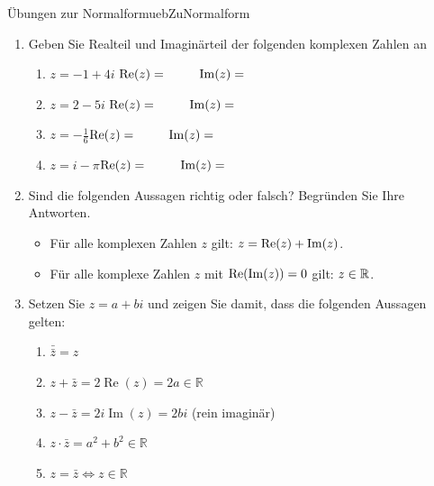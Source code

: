 \begin{ueb}
    {Übungen zur Normalform}{uebZuNormalform}
    \begin{enumerate}
        \item Geben Sie Realteil und Imaginärteil der folgenden komplexen Zahlen an
    
        \begin{enumerate}
            \item $z=-1+4 i$ \hfill $\mathrm{Re}(z)=\phantom{aaaa}$ \hspace{2.5cm} $\mathrm{Im}(z)=\phantom{aaaa}$\hspace{3cm}\phantom{a}
            \item $z=2-5 i$ \hfill $\mathrm{Re}(z)=\phantom{aaaa}$ \hspace{2.5cm} $\mathrm{Im}(z)=\phantom{aaaa}$\hspace{3cm}\phantom{a}
        
            \item $z=-\frac{1}{6}$\hfill $\mathrm{Re}(z)=\phantom{aaaa}$ \hspace{2.5cm} $\mathrm{Im}(z)=\phantom{aaaa}$\hspace{3cm}\phantom{a}
            \item $z=i-\pi$\hfill $\mathrm{Re}(z)=\phantom{aaaa}$ \hspace{2.5cm} $\mathrm{Im}(z)=\phantom{aaaa}$\hspace{3cm}\phantom{a}
        
        \end{enumerate}
        \item Sind die folgenden Aussagen richtig oder falsch? Begründen Sie Ihre Antworten.
        \begin{itemize}
            \item Für alle komplexen Zahlen $z$ gilt: $z=\mathrm{Re}(z)+\mathrm{Im}(z)$.
            \item Für alle komplexe Zahlen $z$ mit $\mathrm{Re}(\mathrm{Im}(z))=0$ gilt: $z \in \mathbb{R}$.
        \end{itemize}
        \item Setzen Sie  $z = a + bi$ und zeigen Sie damit, dass die folgenden Aussagen gelten:
        \begin{enumerate}
            \item $\bar{\bar{z}}= z$
            \item $z + \bar{z} = 2\operatorname{Re}(z) = 2a \in \mathbb{R}$
            \item $z - \bar{z} = 2i\operatorname{Im}(z) = 2bi$ (rein imaginär)
             \item  $z \cdot \bar{z} = a^2 + b^2 \in \mathbb{R}$
            \item $z = \bar{z} \iff z \in \mathbb{R}$
        \end{enumerate}

    \end{enumerate}
\end{ueb}


